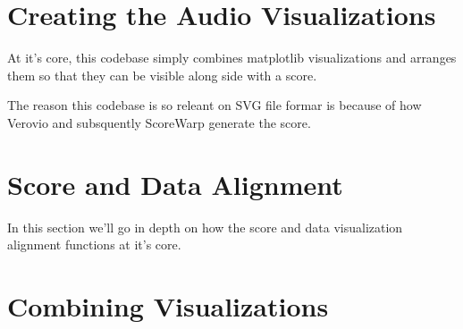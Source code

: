 \section{Creating the Audio Visualizations}
At it's core, this codebase simply combines matplotlib visualizations and arranges them so that they can be visible along side with a score. 



The reason this codebase is so releant on SVG file formar is because of how Verovio and subsquently ScoreWarp generate the score.

\section{Score and Data Alignment}
In this section we'll go in depth on how the score and data visualization alignment functions at it's core. 

\section{Combining Visualizations}

